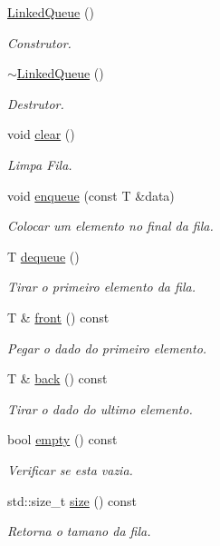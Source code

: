 \begin{DoxyCompactItemize}
\item 
\hyperlink{classstructures_1_1LinkedQueue_aae2a207f04610f5bb460de8b4f5c7650}{Linked\+Queue} ()
\begin{DoxyCompactList}\small\item\em Construtor. \end{DoxyCompactList}\item 
\hyperlink{classstructures_1_1LinkedQueue_ad3f70a9465ecbf8868ad9206e2b01711}{$\sim$\+Linked\+Queue} ()
\begin{DoxyCompactList}\small\item\em Destrutor. \end{DoxyCompactList}\item 
void \hyperlink{classstructures_1_1LinkedQueue_a67dfb58a8feb96abccbd20862767e981}{clear} ()
\begin{DoxyCompactList}\small\item\em Limpa Fila. \end{DoxyCompactList}\item 
void \hyperlink{classstructures_1_1LinkedQueue_a6e9d6e444c5d534d01736bb82c34c815}{enqueue} (const T \&data)
\begin{DoxyCompactList}\small\item\em Colocar um elemento no final da fila. \end{DoxyCompactList}\item 
T \hyperlink{classstructures_1_1LinkedQueue_af6037408a07637554b8a8be7201a756d}{dequeue} ()
\begin{DoxyCompactList}\small\item\em Tirar o primeiro elemento da fila. \end{DoxyCompactList}\item 
T \& \hyperlink{classstructures_1_1LinkedQueue_a904219098f1f6b3aa229a8ea0f929b64}{front} () const
\begin{DoxyCompactList}\small\item\em Pegar o dado do primeiro elemento. \end{DoxyCompactList}\item 
T \& \hyperlink{classstructures_1_1LinkedQueue_ac69ee50f58e8501f7eaddec5b474a87c}{back} () const
\begin{DoxyCompactList}\small\item\em Tirar o dado do ultimo elemento. \end{DoxyCompactList}\item 
bool \hyperlink{classstructures_1_1LinkedQueue_a24995d6b61ce9e8d05718c966b699c5a}{empty} () const
\begin{DoxyCompactList}\small\item\em Verificar se esta vazia. \end{DoxyCompactList}\item 
std\+::size\+\_\+t \hyperlink{classstructures_1_1LinkedQueue_ab86b0d95b796c277a21b89f106efd173}{size} () const
\begin{DoxyCompactList}\small\item\em Retorna o tamano da fila. \end{DoxyCompactList}\end{DoxyCompactItemize}


